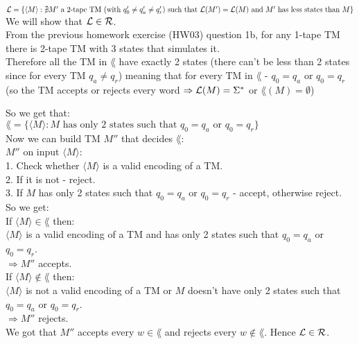 $\mathcal{L} = \{\langle M \rangle : \nexists M' \text{ a 2-tape TM } (\text{with } q'_0 \neq q'_a \neq q'_r) \text{ such that } \\
    \mathcal{L}(M')=\mathcal{L}(M) \text{ and } M' \text{ has less states than } M\}$ \\

We will show that $\mathcal{L} \in \mathcal{R}$. \\

From the previous homework exercise (HW03) question 1b, for any 1-tape TM there is 2-tape TM with 3 states that simulates it. \\
Therefore all the TM in $\lang$ have exactly 2 states (there can't be less than 2 states since for every TM $q_a \neq q_r$)
meaning that for every TM in $\lang$ - $q_0 = q_a$ or $q_0 = q_r$ (so the TM accepts or rejects every word
$\Rightarrow \mathcal{L}(M) = \Sigma^*$ or $\lang(M) = \emptyset$)

So we get that: \\
$\lang = \{\langle M \rangle : M \text{ has only 2 states such that } q_0 = q_a \text{ or }q_0 = q_r\}$ \\

Now we can build TM $M''$ that decides $\lang$: \\
$M''$ on input $\langle M \rangle$: \\
1. Check whether $\langle M \rangle$ is a valid encoding of a TM. \\
2. If it is not - reject. \\
3. If $M$ has only 2 states such that $q_0 = q_a$ or $q_0 = q_r$ - accept, otherwise reject. \\

So we get: \\
If $\langle M \rangle \in \lang$ then: \\
$\langle M \rangle$ is a valid encoding of a TM and has only 2 states such that $q_0 = q_a$ or $q_0 = q_r$. \\
$\Rightarrow M''$ accepts. \\

If $\langle M \rangle \notin \lang$ then: \\
$\langle M \rangle$ is not a valid encoding of a TM or $M$ doesn't have only 2 states such that $q_0 = q_a$ or $q_0 = q_r$. \\
$\Rightarrow M''$ rejects. \\

We got that $M''$ accepts every $w \in \lang$ and rejects every $w \notin \lang$. Hence $\mathcal{L} \in \mathcal{R}$. \\
